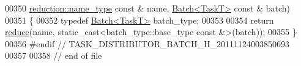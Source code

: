 \begin{DoxyCode}
00350     \hyperlink{classhryky_1_1reduction_1_1_string}{reduction::name_type} \textcolor{keyword}{const} & name, \hyperlink{classhryky_1_1task_1_1distributor_1_1_batch}{Batch<TaskT>} \textcolor{keyword}{const} & batch)
00351 \{
00352     \textcolor{keyword}{typedef} \hyperlink{classhryky_1_1task_1_1distributor_1_1_batch}{Batch<TaskT>} batch\_type;
00353     
00354     \textcolor{keywordflow}{return} \hyperlink{group__task_ga89a7a92c43485c438438ab4b97184a27}{reduce}(name, static\_cast<batch\_type::base\_type const &>(batch));
00355 \}
00356 \textcolor{preprocessor}{#endif // TASK\_DISTRIBUTOR\_BATCH\_H\_20111124003850693}
00357 \textcolor{preprocessor}{}
00358 \textcolor{comment}{// end of file}
\end{DoxyCode}
